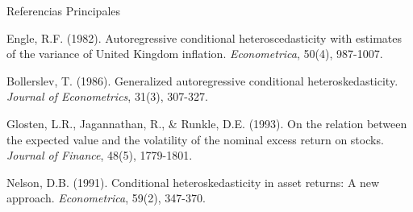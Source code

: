 \begin{frame}{Referencias Principales}
    \begin{thebibliography}{9}
        Engle, R.F. (1982). Autoregressive conditional heteroscedasticity with estimates of the variance of United Kingdom inflation. \textit{Econometrica}, 50(4), 987-1007.
        
        Bollerslev, T. (1986). Generalized autoregressive conditional heteroskedasticity. \textit{Journal of Econometrics}, 31(3), 307-327.
        
        Glosten, L.R., Jagannathan, R., \& Runkle, D.E. (1993). On the relation between the expected value and the volatility of the nominal excess return on stocks. \textit{Journal of Finance}, 48(5), 1779-1801.
        
        Nelson, D.B. (1991). Conditional heteroskedasticity in asset returns: A new approach. \textit{Econometrica}, 59(2), 347-370.
    \end{thebibliography}
\end{frame}